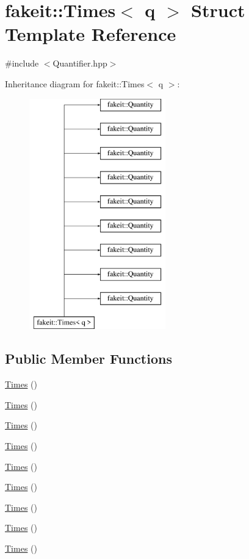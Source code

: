 \hypertarget{structfakeit_1_1Times}{}\section{fakeit\+::Times$<$ q $>$ Struct Template Reference}
\label{structfakeit_1_1Times}


{\ttfamily \#include $<$Quantifier.\+hpp$>$}

Inheritance diagram for fakeit\+::Times$<$ q $>$\+:\begin{figure}[H]
\begin{center}
\leavevmode
\includegraphics[height=10.000000cm]{structfakeit_1_1Times}
\end{center}
\end{figure}
\subsection*{Public Member Functions}
\begin{DoxyCompactItemize}
\item 
\mbox{\hyperlink{structfakeit_1_1Times_a8b8f13261b992a10b63594af75c6f159}{Times}} ()
\item 
\mbox{\hyperlink{structfakeit_1_1Times_a8b8f13261b992a10b63594af75c6f159}{Times}} ()
\item 
\mbox{\hyperlink{structfakeit_1_1Times_a8b8f13261b992a10b63594af75c6f159}{Times}} ()
\item 
\mbox{\hyperlink{structfakeit_1_1Times_a8b8f13261b992a10b63594af75c6f159}{Times}} ()
\item 
\mbox{\hyperlink{structfakeit_1_1Times_a8b8f13261b992a10b63594af75c6f159}{Times}} ()
\item 
\mbox{\hyperlink{structfakeit_1_1Times_a8b8f13261b992a10b63594af75c6f159}{Times}} ()
\item 
\mbox{\hyperlink{structfakeit_1_1Times_a8b8f13261b992a10b63594af75c6f159}{Times}} ()
\item 
\mbox{\hyperlink{structfakeit_1_1Times_a8b8f13261b992a10b63594af75c6f159}{Times}} ()
\item 
\mbox{\hyperlink{structfakeit_1_1Times_a8b8f13261b992a10b63594af75c6f159}{Times}} ()
\end{DoxyCompactItemize}

